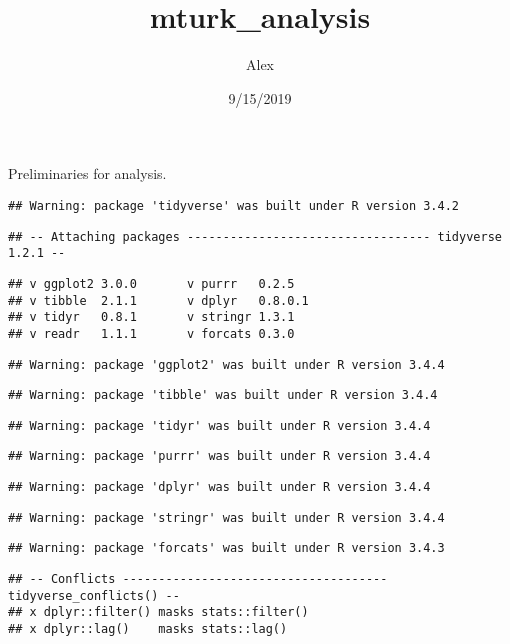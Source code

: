 \documentclass[]{article}
\title{mturk\_analysis}
\author{Alex}
\date{9/15/2019}
\begin{document}
\maketitle

Preliminaries for analysis.

\begin{verbatim}
## Warning: package 'tidyverse' was built under R version 3.4.2
\end{verbatim}

\begin{verbatim}
## -- Attaching packages ---------------------------------- tidyverse 1.2.1 --
\end{verbatim}

\begin{verbatim}
## v ggplot2 3.0.0       v purrr   0.2.5  
## v tibble  2.1.1       v dplyr   0.8.0.1
## v tidyr   0.8.1       v stringr 1.3.1  
## v readr   1.1.1       v forcats 0.3.0
\end{verbatim}

\begin{verbatim}
## Warning: package 'ggplot2' was built under R version 3.4.4
\end{verbatim}

\begin{verbatim}
## Warning: package 'tibble' was built under R version 3.4.4
\end{verbatim}

\begin{verbatim}
## Warning: package 'tidyr' was built under R version 3.4.4
\end{verbatim}

\begin{verbatim}
## Warning: package 'purrr' was built under R version 3.4.4
\end{verbatim}

\begin{verbatim}
## Warning: package 'dplyr' was built under R version 3.4.4
\end{verbatim}

\begin{verbatim}
## Warning: package 'stringr' was built under R version 3.4.4
\end{verbatim}

\begin{verbatim}
## Warning: package 'forcats' was built under R version 3.4.3
\end{verbatim}

\begin{verbatim}
## -- Conflicts ------------------------------------- tidyverse_conflicts() --
## x dplyr::filter() masks stats::filter()
## x dplyr::lag()    masks stats::lag()
\end{verbatim}
\end{document}

